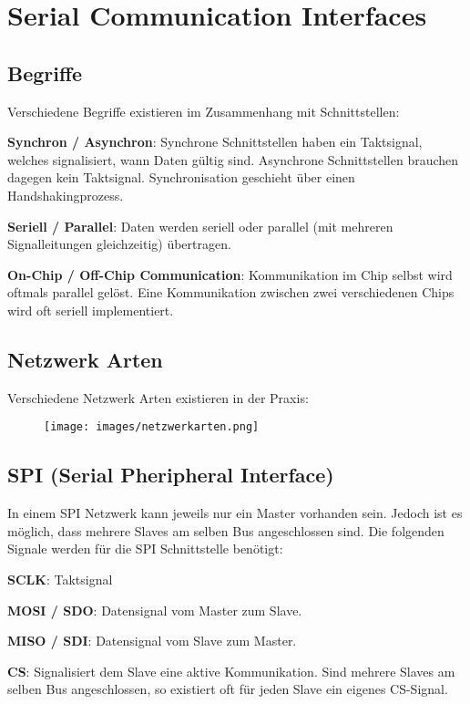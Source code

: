 \section{Serial Communication Interfaces}
\subsection{Begriffe}
Verschiedene Begriffe existieren im Zusammenhang mit Schnittstellen:
\begin{compactitem}
    \item \textbf{Synchron / Asynchron}: Synchrone Schnittstellen haben ein Taktsignal, welches signalisiert, wann Daten gültig sind. Asynchrone Schnittstellen brauchen dagegen kein Taktsignal. Synchronisation geschieht über einen Handshakingprozess.
    \item \textbf{Seriell / Parallel}: Daten werden seriell oder parallel (mit mehreren Signalleitungen gleichzeitig) übertragen.
    \item \textbf{On-Chip / Off-Chip Communication}: Kommunikation im Chip selbst wird oftmals parallel gelöst. Eine Kommunikation zwischen zwei verschiedenen Chips wird oft seriell implementiert.
\end{compactitem}

\begin{multicols}{2}
    \subsection{Netzwerk Arten}
    Verschiedene Netzwerk Arten existieren in der Praxis:
    \begin{figure}[H]
        \texttt{[image: images/netzwerkarten.png]}
    \end{figure}

    \subsection{SPI (Serial Pheripheral Interface)}
    In einem SPI Netzwerk kann jeweils nur ein Master vorhanden sein. Jedoch ist es möglich, dass mehrere Slaves am selben Bus angeschlossen sind. Die folgenden Signale werden für die SPI Schnittstelle benötigt:
    \begin{compactitem}
        \item \textbf{SCLK}: Taktsignal
        \item \textbf{MOSI / SDO}: Datensignal vom Master zum Slave.
        \item \textbf{MISO / SDI}: Datensignal vom Slave zum Master.
        \item \textbf{CS}: Signalisiert dem Slave eine aktive Kommunikation. Sind mehrere Slaves am selben Bus angeschlossen, so existiert oft für jeden Slave ein eigenes CS-Signal.
    \end{compactitem}
\end{multicols}

